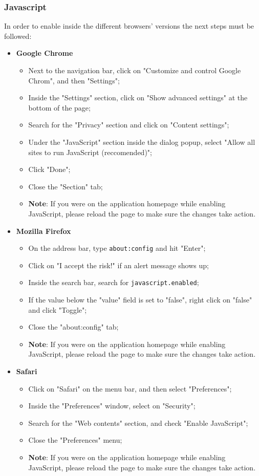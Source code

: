 \subsubsection{Javascript}
In order to enable  inside the different browsers' versions the next steps must be followed:
\begin{itemize}
	\item \textbf{Google Chrome}
		\begin{itemize}
			\item Next to the navigation bar, click on "Customize and control Google Chrom", and then "Settings";
			\item Inside the "Settings" section, click on "Show advanced settings" at the bottom of the page;
			\item Search for the "Privacy" section and click on "Content settings";
			\item Under the "JavaScript" section inside the dialog popup, select "Allow all sites to run JavaScript (reccomended)";
			\item Click "Done";
			\item Close the "Section" tab;
			\item \textbf{Note}: If you were on the application homepage while enabling JavaScript, please reload the page to make sure the changes take action.
		\end{itemize}
		
	\item \textbf{Mozilla Firefox}
		\begin{itemize}
			\item On the address bar, type \texttt{about:config} and hit "Enter";
			\item Click on "I accept the risk!" if an alert message shows up;
			\item Inside the search bar, search for \texttt{javascript.enabled};
			\item If the value below the "value" field is set to "false", right click on "false" and click "Toggle";
			\item Close the "about:config" tab;
			\item \textbf{Note}: If you were on the application homepage while enabling JavaScript, please reload the page to make sure the changes take action.
		\end{itemize}
		
	\item \textbf{Safari}
		\begin{itemize}
			\item Click on "Safari" on the menu bar, and then select "Preferences";
			\item Inside the "Preferences" window, select on "Security";
			\item Search for the "Web contents" section, and check "Enable JavaScript"; 
			\item Close the "Preferences" menu;
			\item \textbf{Note}: If you were on the application homepage while enabling JavaScript, please reload the page to make sure the changes take action.
		\end{itemize}
\end{itemize}


